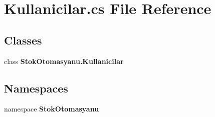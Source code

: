 \section{Kullanicilar.\+cs File Reference}
\label{_kullanicilar_8cs}
\subsection*{Classes}
\begin{DoxyCompactItemize}
\item 
class \textbf{ Stok\+Otomasyanu.\+Kullanicilar}
\end{DoxyCompactItemize}
\subsection*{Namespaces}
\begin{DoxyCompactItemize}
\item 
namespace \textbf{ Stok\+Otomasyanu}
\end{DoxyCompactItemize}
